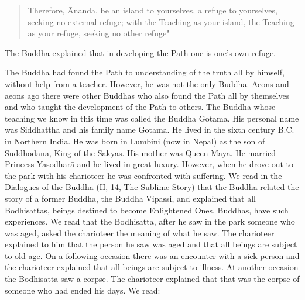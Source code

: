 \documentclass{book}
\begin{document}
\begin{quote}
Therefore, Ānanda, be an island to yourselves, a refuge to yourselves,
seeking no external refuge; with the Teaching as your island, the
Teaching as your refuge, seeking no other refuge"
\end{quote}

The Buddha explained that in developing the Path one is one's own
refuge.

The Buddha had found the Path to understanding of the truth all by
himself, without help from a teacher. However, he was not the only
Buddha. Aeons and aeons ago there were other Buddhas who also found the
Path all by themselves and who taught the development of the Path to
others. The Buddha whose teaching we know in this time was called the
Buddha Gotama. His personal name was Siddhattha and his family name
Gotama. He lived in the sixth century B.C. in Northern India. He was
born in Lumbini (now in Nepal) as the son of Suddhodana, King of the
Sākyas. His mother was Queen Māyā. He married Princess Yasodharā and he
lived in great luxury. However, when he drove out to the park with his
charioteer he was confronted with suffering. We read in the Dialogues of
the Buddha (II, 14, The Sublime Story) that the Buddha related the story
of a former Buddha, the Buddha Vipassi, and explained that all
Bodhisattas, beings destined to become Enlightened Ones, Buddhas, have
such experiences. We read that the Bodhisatta, after he saw in the park
someone who was aged, asked the charioteer the meaning of what he saw.
The charioteer explained to him that the person he saw was aged and that
all beings are subject to old age. On a following occasion there was an
encounter with a sick person and the charioteer explained that all
beings are subject to illness. At another occasion the Bodhisatta saw a
corpse. The charioteer explained that that was the corpse of someone who
had ended his days. We read:
\end{document}
